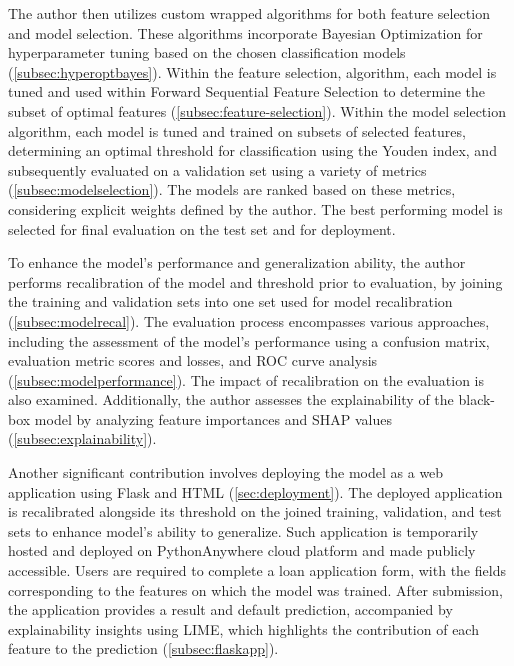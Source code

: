 The author then utilizes custom wrapped algorithms for both feature selection and model selection.
These algorithms incorporate Bayesian Optimization for hyperparameter tuning based on the chosen classification models (\autoref{subsec:hyperoptbayes}).
Within the feature selection, algorithm, each model is tuned and used within Forward Sequential Feature Selection to determine the subset of optimal features (\autoref{subsec:feature-selection}).
Within the model selection algorithm, each model is tuned and trained on subsets of selected features, determining an optimal threshold for classification using the Youden index, and subsequently evaluated on a validation set using a variety of metrics (\autoref{subsec:modelselection}).
The models are ranked based on these metrics, considering explicit weights defined by the author.
The best performing model is selected for final evaluation on the test set and for deployment.


To enhance the model's performance and generalization ability, the author performs recalibration of the model and threshold prior to evaluation, by joining the training and validation sets into one set used for model recalibration (\autoref{subsec:modelrecal}).
The evaluation process encompasses various approaches, including the assessment of the model's performance using a confusion matrix, evaluation metric scores and losses, and ROC curve analysis (\autoref{subsec:modelperformance}).
The impact of recalibration on the evaluation is also examined.
Additionally, the author assesses the explainability of the black-box model by analyzing feature importances and SHAP values (\autoref{subsec:explainability}).


Another significant contribution involves deploying the model as a web application using Flask and HTML (\autoref{sec:deployment}).
The deployed application is recalibrated alongside its threshold on the joined training, validation, and test sets to enhance model's ability to generalize.
Such application is temporarily hosted and deployed on PythonAnywhere cloud platform and made publicly accessible.
Users are required to complete a loan application form, with the fields corresponding to the features on which the model was trained.
After submission, the application provides a result and default prediction, accompanied by explainability insights using LIME, which highlights the contribution of each feature to the prediction (\autoref{subsec:flaskapp}).


